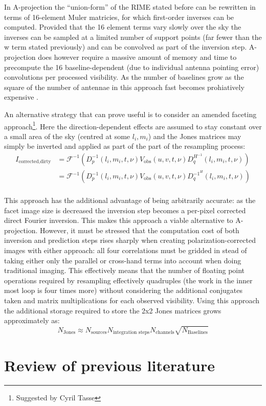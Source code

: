 In A-projection the ``union-form'' of the RIME stated before can be rewritten in terms of 16-element Muler matricies, for which first-order 
inverses can be computed. Provided that the 16 element terms vary slowly over the sky the inverses can be sampled at a limited number
of support points (far fewer than the w term stated previously) and can be convolved as part of the inversion step. A-projection does 
however require a massive amount of memory and time to precompute the 16 baseline-dependent (due to individual antenna pointing error) 
convolutions per processed visibility. As the number of baselines grow as the square of the number of antennae in this approach fast 
becomes prohiatively expensive \cite{tasse2013applying}.

An alternative strategy that can prove useful is to consider an amended faceting approach\footnote{Suggested by Cyril Tasse}. Here the 
direction-dependent effects are assumed to stay constant over a small area of the sky (centred at some $l_i,m_i$) and the Jones 
matrices may simply be inverted and applied as part of the part of the resampling process:
\begin{equation*}
 \begin{split}
 I_{\text{corrected,dirty}} &= \mathcal{F}^{-1}(D_p^{-1}(l_i,m_i,t,\nu)V_{\text{obs}}(u,v,t,\nu)D_q^{H^{-1}}(l_i,m_i,t,\nu))\\
			    &= \mathcal{F}^{-1}(D_p^{-1}(l_i,m_i,t,\nu)V_{\text{obs}}(u,v,t,\nu)D_q^{{-1}^H}(l_i,m_i,t,\nu))\\
 \end{split}
\end{equation*}

This approach has the additional advantage of being arbitrarily accurate: as the facet image size is decreased the inversion step
becomes a per-pixel corrected direct Fourier inversion. This makes this approach a viable alternative to A-projection. However, 
it must be stressed that the computation cost of both inversion and prediction steps rises sharply when creating polarization-corrected 
images with either approach: all four correlations must be gridded in stead of taking either only the parallel or cross-hand terms into 
account when doing traditional imaging. This effectively means that the number of floating point operations required by resampling 
effectively quadruples (the work in the inner most loop is four times more) without considering the additional conjugates taken and 
matrix multiplications for each observed visibility. Using this approach the additional storage required to store the 2x2 Jones 
matrices grows approximately as:
\begin{equation*}
 N_{\text{Jones}} \approx N_{\text{sources}}N_{\text{integration steps}}N_{\text{channels}}\sqrt{N_{\text{Baselines}}}
\end{equation*}

\section{Review of previous literature}